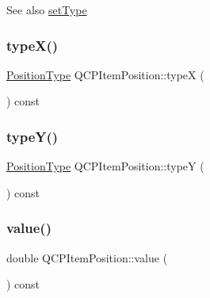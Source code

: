 \begin{DoxySeeAlso}{See also}
\hyperlink{class_q_c_p_item_position_aa476abf71ed8fa4c537457ebb1a754ad}{set\+Type} 
\end{DoxySeeAlso}
\mbox{\label{class_q_c_p_item_position_a1415911868835701c04250566bfc681d}} 
\subsubsection{\texorpdfstring{type\+X()}{typeX()}}
{\footnotesize\ttfamily \hyperlink{class_q_c_p_item_position_aad9936c22bf43e3d358552f6e86dbdc8}{Position\+Type} Q\+C\+P\+Item\+Position\+::typeX (\begin{DoxyParamCaption}{ }\end{DoxyParamCaption}) const\hspace{0.3cm}{\ttfamily [inline]}}

\mbox{\label{class_q_c_p_item_position_ae47bac6f679c58f9e1c78dc63d56f331}} 
\subsubsection{\texorpdfstring{type\+Y()}{typeY()}}
{\footnotesize\ttfamily \hyperlink{class_q_c_p_item_position_aad9936c22bf43e3d358552f6e86dbdc8}{Position\+Type} Q\+C\+P\+Item\+Position\+::typeY (\begin{DoxyParamCaption}{ }\end{DoxyParamCaption}) const\hspace{0.3cm}{\ttfamily [inline]}}

\mbox{\label{class_q_c_p_item_position_acfcf86f840a7366a4299bff593d5d636}} 
\subsubsection{\texorpdfstring{value()}{value()}}
{\footnotesize\ttfamily double Q\+C\+P\+Item\+Position\+::value (\begin{DoxyParamCaption}{ }\end{DoxyParamCaption}) const\hspace{0.3cm}{\ttfamily [inline]}}

